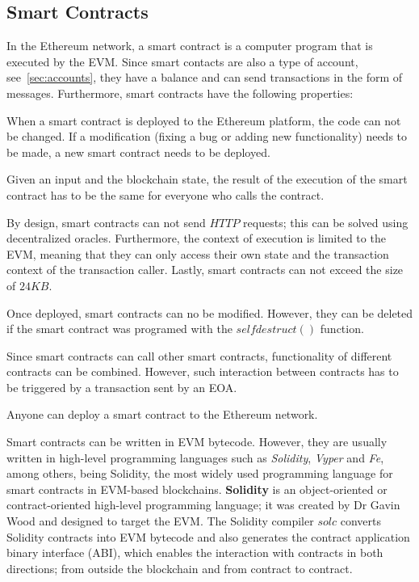 \documentclass[11pt,a4paper]{report}
\begin{document}
\subsection{Smart Contracts}\label{sec:sc}
In the Ethereum network, a smart contract\cite{book:masteringETH-sc-solidity}\cite{smartcontracts} is a computer program that is executed by the EVM. Since smart contacts are also a type of account, see~\ref{sec:accounts}, they have a balance and can send transactions in the form of messages. Furthermore, smart contracts have the following properties:
\begin{description}[style=nextline] %
	\item[{\textbf{Immutability}}] When a smart contract is deployed to the Ethereum platform, the code can not be changed. If a modification (fixing a bug or adding new functionality) needs to be made, a new smart contract needs to be deployed.
	\item[{\textbf{Determinism}}] Given an input and the blockchain state, the result of the execution of the smart contract has to be the same for everyone who calls the contract.
	\item[{\textbf{Limitations}}] By design, smart contracts can not send $HTTP$ requests; this can be solved using decentralized oracles\cite{oracles}. Furthermore, the context of execution is limited to the EVM, meaning that they can only access their own state and the transaction context of the transaction caller. Lastly, smart contracts can not exceed the size of $24KB$.
	\item[{\textbf{Lifecycle}}] Once deployed, smart contracts can no be modified. However, they can be deleted if the smart contract was programed with the $selfdestruct()$ function.
	\item[{\textbf{Composability}}] Since smart contracts can call other smart contracts, functionality of different contracts can be combined. However, such interaction between contracts has to be triggered by a transaction sent by an EOA.
	\item[{\textbf{Permissionless}}] Anyone can deploy a smart contract to the Ethereum network.    
\end{description}
Smart contracts can be written in EVM bytecode\cite{evmbytecode}. However, they are usually written in high-level programming languages such as \textit{Solidity}, \textit{Vyper}\cite{vyper} and \textit{Fe}\cite{fe}, among others, being Solidity, the most widely used programming language for smart contracts in EVM-based blockchains. \textbf{Solidity}\cite{book:masteringETH-sc-solidity}\cite{solidity} is an object-oriented or contract-oriented high-level programming language; it was created by Dr Gavin Wood and designed to target the EVM.  The Solidity compiler $solc$ converts Solidity contracts into EVM bytecode and also generates the contract application binary interface (ABI)\cite{abi}, which enables the interaction with contracts in both directions; from outside the blockchain and from contract to contract.
 
\end{document}
